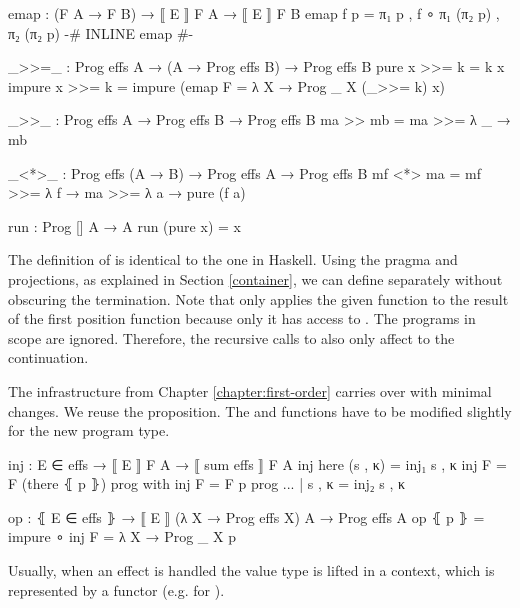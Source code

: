 \begin{code}
emap : (F A → F B) → ⟦ E ⟧ F A → ⟦ E ⟧ F B
emap f p = π₁ p , f ∘ π₁ (π₂ p) , π₂ (π₂ p)
{-# INLINE emap #-}

_>>=_ : Prog effs A → (A → Prog effs B) → Prog effs B
pure x    >>= k = k x
impure x  >>= k = impure (emap {F = λ X → Prog _ X} (_>>= k) x)
\end{code}
\begin{code}[hide]
_>>_ : Prog effs A → Prog effs B → Prog effs B
ma >> mb = ma >>= λ _ → mb

_<*>_ : Prog effs (A → B) → Prog effs A → Prog effs B
mf <*> ma = mf >>= λ f → ma >>= λ a → pure (f a)

run : Prog [] A → A
run (pure x) = x
\end{code}
The definition of \AgdaFunction{>>=} is identical to the one in Haskell.
Using the  pragma and projections, as explained in Section
\ref{container}, we can define  separately without obscuring
the termination.
Note that  only applies the given function to the result of
the first position function because only it has access to .
The programs in scope are ignored.
Therefore, the recursive calls to \AgdaFunction{>>=} also only affect to the
continuation.

The infrastructure from Chapter \ref{chapter:first-order} carries over with
minimal changes.
We reuse the  proposition.
The  and  functions have to be modified
slightly for the new program type.

\begin{code}
inj : E ∈ effs → ⟦ E ⟧ F A → ⟦ sum effs ⟧ F A
inj here           (s , κ) = inj₁ s , κ
inj {F = F} (there ⦃ p ⦄)  prog with inj {F = F} p prog
... | s , κ = inj₂ s , κ

op : ⦃ E ∈ effs ⦄ → ⟦ E ⟧ (λ X → Prog effs X) A → Prog effs A
op ⦃ p ⦄ = impure ∘ inj {F = λ X → Prog _ X} p
\end{code}
Usually, when an effect is handled the value type is lifted in a context, which
is represented by a functor (e.g.  for ).

